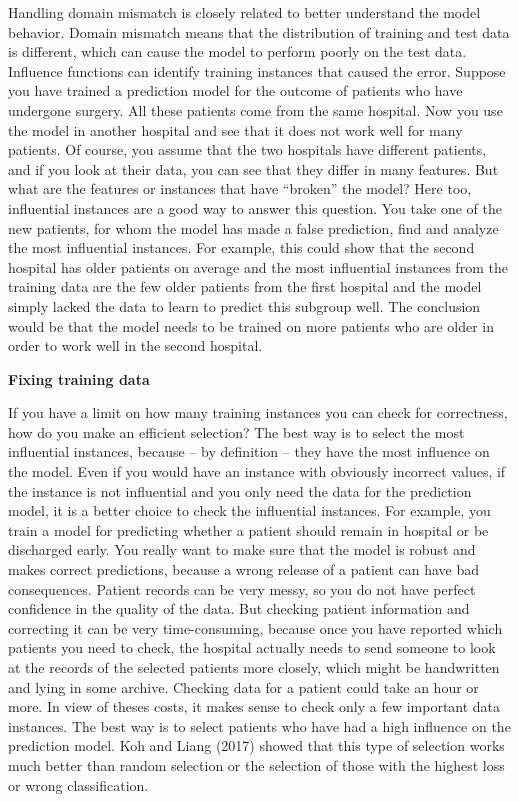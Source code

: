 \documentclass[
  12pt,
]{krantz}
\begin{document}
Handling domain mismatch is closely related to better understand the model behavior.
Domain mismatch means that the distribution of training and test data is different, which can cause the model to perform poorly on the test data.
Influence functions can identify training instances that caused the error.
Suppose you have trained a prediction model for the outcome of patients who have undergone surgery.
All these patients come from the same hospital.
Now you use the model in another hospital and see that it does not work well for many patients.
Of course, you assume that the two hospitals have different patients, and if you look at their data, you can see that they differ in many features.
But what are the features or instances that have ``broken'' the model?
Here too, influential instances are a good way to answer this question.
You take one of the new patients, for whom the model has made a false prediction, find and analyze the most influential instances.
For example, this could show that the second hospital has older patients on average and the most influential instances from the training data are the few older patients from the first hospital and the model simply lacked the data to learn to predict this subgroup well.
The conclusion would be that the model needs to be trained on more patients who are older in order to work well in the second hospital.

\textbf{Fixing training data}

If you have a limit on how many training instances you can check for correctness, how do you make an efficient selection?
The best way is to select the most influential instances, because -- by definition -- they have the most influence on the model.
Even if you would have an instance with obviously incorrect values, if the instance is not influential and you only need the data for the prediction model, it is a better choice to check the influential instances.
For example, you train a model for predicting whether a patient should remain in hospital or be discharged early.
You really want to make sure that the model is robust and makes correct predictions, because a wrong release of a patient can have bad consequences.
Patient records can be very messy, so you do not have perfect confidence in the quality of the data.
But checking patient information and correcting it can be very time-consuming, because once you have reported which patients you need to check, the hospital actually needs to send someone to look at the records of the selected patients more closely, which might be handwritten and lying in some archive.
Checking data for a patient could take an hour or more.
In view of theses costs, it makes sense to check only a few important data instances.
The best way is to select patients who have had a high influence on the prediction model.
Koh and Liang (2017) showed that this type of selection works much better than random selection or the selection of those with the highest loss or wrong classification.
\end{document}
